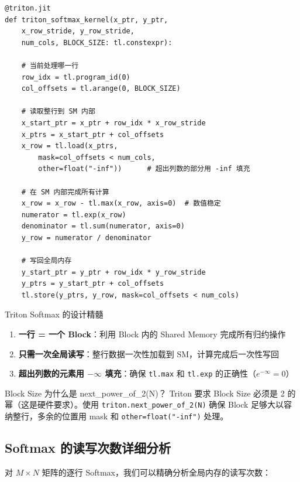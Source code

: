 \documentclass[a4paper]{article}
\begin{document}
\begin{lstlisting}[caption={Triton Softmax 内核——每个 Block 处理一行}]
@triton.jit
def triton_softmax_kernel(x_ptr, y_ptr,
    x_row_stride, y_row_stride,
    num_cols, BLOCK_SIZE: tl.constexpr):

    # 当前处理哪一行
    row_idx = tl.program_id(0)
    col_offsets = tl.arange(0, BLOCK_SIZE)

    # 读取整行到 SM 内部
    x_start_ptr = x_ptr + row_idx * x_row_stride
    x_ptrs = x_start_ptr + col_offsets
    x_row = tl.load(x_ptrs,
        mask=col_offsets < num_cols,
        other=float("-inf"))      # 超出列数的部分用 -inf 填充

    # 在 SM 内部完成所有计算
    x_row = x_row - tl.max(x_row, axis=0)  # 数值稳定
    numerator = tl.exp(x_row)
    denominator = tl.sum(numerator, axis=0)
    y_row = numerator / denominator

    # 写回全局内存
    y_start_ptr = y_ptr + row_idx * y_row_stride
    y_ptrs = y_start_ptr + col_offsets
    tl.store(y_ptrs, y_row, mask=col_offsets < num_cols)
\end{lstlisting}

\begin{importantbox}{Triton Softmax 的设计精髓}
\begin{enumerate}
    \item \textbf{一行 = 一个 Block}：利用 Block 内的 Shared Memory 完成所有归约操作
    \item \textbf{只需一次全局读写}：整行数据一次性加载到 SM，计算完成后一次性写回
    \item \textbf{超出列数的元素用 $-\infty$ 填充}：确保 \texttt{tl.max} 和 \texttt{tl.exp} 的正确性（$e^{-\infty} = 0$）
\end{enumerate}
\end{importantbox}

\begin{knowledgebox}{Block Size 为什么是 next\_power\_of\_2(N)？}
Triton 要求 Block Size 必须是 2 的幂（这是硬件要求）。使用 \texttt{triton.next\_power\_of\_2(N)} 确保 Block 足够大以容纳整行，多余的位置用 mask 和 \texttt{other=float("-inf")} 处理。
\end{knowledgebox}

\subsection{Softmax 的读写次数详细分析}

对 $M \times N$ 矩阵的逐行 Softmax，我们可以精确分析全局内存的读写次数：
\end{document}
